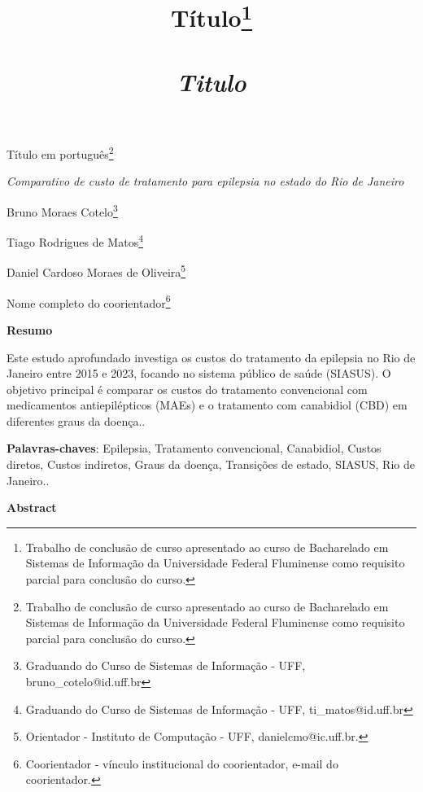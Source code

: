 \documentclass[article,a4paper,12pt,brazil,sumario=tradicional]{abntex2}
\title{ {\Large Título\footnote{Trabalho de conclusão de curso apresentado ao curso de Bacharelado em Sistemas de Informação da Universidade Federal Fluminense como requisito parcial para conclusão do curso.}\\\\
\vspace{.2} 
\textit{Titulo}\\}}
\date{ }
\begin{document}
\textual

\begin{center}
{\Large Título em português\footnote{Trabalho de conclusão de curso apresentado ao curso de Bacharelado em Sistemas de Informação da Universidade Federal Fluminense como requisito parcial para conclusão do curso.}

\textit{Comparativo de custo de tratamento para epilepsia no estado do Rio de Janeiro}\\}
\end{center}
\vspace{.2cm} 

\begin{flushright}
Bruno Moraes Cotelo\footnote{Graduando do Curso de Sistemas de Informação - UFF, bruno\_cotelo@id.uff.br}

Tiago Rodrigues de Matos\footnote{Graduando do Curso de Sistemas de Informação - UFF, ti\_matos@id.uff.br}

Daniel Cardoso Moraes de Oliveira\footnote{Orientador - Instituto de Computação - UFF, danielcmo@ic.uff.br.} 

Nome completo do coorientador\footnote{Coorientador - vínculo institucional do coorientador, e-mail do coorientador.}
\end{flushright}

\vspace{\onelineskip}

\begin{center}
    \textbf{Resumo}
\end{center}

\vspace{-.3cm}

\noindent Este estudo aprofundado investiga os custos do tratamento da epilepsia no Rio de Janeiro entre 2015 e 2023, focando no sistema público de saúde (SIASUS). O objetivo principal é comparar os custos do tratamento convencional com medicamentos antiepilépticos (MAEs) e o tratamento com canabidiol (CBD) em diferentes graus da doença..

\vspace{.4cm}
 
\noindent
\textbf{Palavras-chaves}: Epilepsia, Tratamento convencional, Canabidiol, Custos diretos, Custos indiretos, Graus da doença, Transições de estado, SIASUS, Rio de Janeiro.. 
 
\vspace{\onelineskip}

\begin{center}
    \textbf{Abstract}
\end{center}
\end{document}
